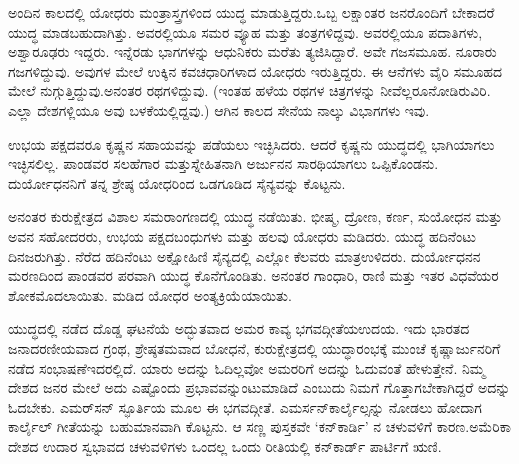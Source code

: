 \vskip 0.1cm

ಅಂದಿನ ಕಾಲದಲ್ಲಿ ಯೋಧರು ಮಂತ್ರಾಸ್ತ್ರಗಳಿಂದ ಯುದ್ಧ ಮಾಡುತ್ತಿದ್ದರು.\break ಒಬ್ಬ ಲಕ್ಷಾಂತರ ಜನರೊಂದಿಗೆ ಬೇಕಾದರೆ ಯುದ್ಧ ಮಾಡಬಹುದಾಗಿತ್ತು. ಅವರಲ್ಲಿಯೂ ಸಮರ ವ್ಯೂಹ ಮತ್ತು ತಂತ್ರಗಳಿದ್ದವು. ಅವರಲ್ಲಿಯೂ ಪದಾತಿಗಳು, ಅಶ್ವಾರೂಢರು ಇದ್ದರು. ಇನ್ನೆರಡು ಭಾಗಗಳನ್ನು ಆಧುನಿಕರು ಮರೆತು ತ್ಯಜಿಸಿದ್ದಾರೆ. ಅವೇ ಗಜ\break ಸಮೂಹ. ನೂರಾರು ಗಜಗಳಿದ್ದುವು. ಅವುಗಳ ಮೇಲೆ ಉಕ್ಕಿನ ಕವಚಧಾರಿಗಳಾದ ಯೋಧರು ಇರುತ್ತಿದ್ದರು. ಈ ಆನೆಗಳು ವೈರಿ ಸಮೂಹದ ಮೇಲೆ ನುಗ್ಗುತ್ತಿದ್ದುವು.\break ಅನಂತರ ರಥಗಳಿದ್ದುವು. (ಇಂತಹ ಹಳೆಯ ರಥಗಳ ಚಿತ್ರಗಳನ್ನು ನೀವೆಲ್ಲರೂ\break ನೋಡಿರುವಿರಿ. ಎಲ್ಲಾ ದೇಶಗಳ್ಲಿಯೂ ಅವು ಬಳಕೆಯಲ್ಲಿದ್ದವು.) ಆಗಿನ ಕಾಲದ ಸೇನೆಯ ನಾಲ್ಕು ವಿಭಾಗಗಳು ಇವು.

\vskip 0.1cm

ಉಭಯ ಪಕ್ಷದವರೂ ಕೃಷ್ಣನ ಸಹಾಯವನ್ನು ಪಡೆಯಲು ಇಚ್ಛಿಸಿದರು. ಆದರೆ ಕೃಷ್ಣನು ಯುದ್ಧದಲ್ಲಿ ಭಾಗಿಯಾಗಲು ಇಚ್ಛಿಸಲಿಲ್ಲ. ಪಾಂಡವರ ಸಲಹೆಗಾರ ಮತ್ತು\break ಸ್ನೇಹಿತನಾಗಿ ಅರ್ಜುನನ ಸಾರಥಿಯಾಗಲು ಒಪ್ಪಿಕೊಂಡನು. ದುರ್ಯೋಧನನಿಗೆ ತನ್ನ ಶ್ರೇಷ್ಠ ಯೋಧರಿಂದ ಒಡಗೂಡಿದ ಸೈನ್ಯವನ್ನು ಕೊಟ್ಟನು.

\vskip 0.1cm

ಅನಂತರ ಕುರುಕ್ಷೇತ್ರದ ವಿಶಾಲ ಸಮರಾಂಗಣದಲ್ಲಿ ಯುದ್ಧ ನಡೆಯಿತು. ಭೀಷ್ಮ, ದ್ರೋಣ, ಕರ್ಣ, ಸುಯೋಧನ ಮತ್ತು ಅವನ ಸಹೋದರರು, ಉಭಯ ಪಕ್ಷದ\break ಬಂಧುಗಳು ಮತ್ತು ಹಲವು ಯೋಧರು ಮಡಿದರು. ಯುದ್ಧ ಹದಿನೆಂಟು ದಿನ\break ಜರುಗಿತ್ತು. ನೆರೆದ ಹದಿನೆಂಟು ಅಕ್ಷೋಹಿಣಿ ಸೈನ್ಯದಲ್ಲಿ ಎಲ್ಲೋ ಕೆಲವರು ಮಾತ್ರ\break ಉಳಿದರು. ದುರ್ಯೋಧನನ ಮರಣದಿಂದ ಪಾಂಡವರ ಪರವಾಗಿ ಯುದ್ಧ ಕೊನೆಗೊಂಡಿತು. ಅನಂತರ ಗಾಂಧಾರಿ, ರಾಣಿ ಮತ್ತು ಇತರ ವಿಧವೆಯರ ಶೋಕ\break ಮೊದಲಾಯಿತು. ಮಡಿದ ಯೋಧರ ಅಂತ್ಯಕ್ರಿಯೆಯಾಯಿತು.

\vskip 0.1cm

ಯುದ್ಧದಲ್ಲಿ ನಡೆದ ದೊಡ್ಡ ಘಟನೆಯೆ ಅದ್ಭುತವಾದ ಅಮರ ಕಾವ್ಯ ಭಗವದ್ಗೀತೆಯ\break ಉದಯ. ಇದು ಭಾರತದ ಜನಾದರಣೀಯವಾದ ಗ್ರಂಥ, ಶ್ರೇಷ್ಠತಮವಾದ ಬೋಧನೆ, ಕುರುಕ್ಷೇತ್ರದಲ್ಲಿ ಯುದ್ಧಾರಂಭಕ್ಕೆ ಮುಂಚೆ ಕೃಷ್ಣಾರ್ಜುನರಿಗೆ ನಡೆದ ಸಂಭಾಷಣೆ\break ಇದರಲ್ಲಿದೆ. ಯಾರು ಅದನ್ನು ಓದಿಲ್ಲವೋ ಅಮರರಿಗೆ ಅದನ್ನು ಓದುವಂತೆ ಹೇಳುತ್ತೇನೆ. ನಿಮ್ಮ ದೇಶದ ಜನರ ಮೇಲೆ ಅದು ಎಷ್ಟೊಂದು ಪ್ರಭಾವವನ್ನುಂಟುಮಾಡಿದೆ ಎಂಬುದು ನಿಮಗೆ ಗೊತ್ತಾಗಬೇಕಾಗಿದ್ದರೆ ಅದನ್ನು ಓದಬೇಕು. ಎಮರ್​ಸನ್​ ಸ್ಫೂರ್ತಿಯ ಮೂಲ ಈ ಭಗವದ್ಗೀತೆ. ಎಮರ್ಸನ್​ ಕಾರ್ಲೈಲ್ಸನ್ನು ನೋಡಲು ಹೋದಾಗ ಕಾರ್ಲೈಲ್​ ಗೀತೆಯನ್ನು ಬಹುಮಾನವಾಗಿ ಕೊಟ್ಟನು. ಆ ಸಣ್ಣ ಪುಸ್ತಕವೇ ‘ಕನ್​ಕಾರ್ಡಿ’ ನ ಚಳುವಳಿಗೆ ಕಾರಣ.\break ಅಮೆರಿಕಾ ದೇಶದ ಉದಾರ ಸ್ವಭಾವದ ಚಳುವಳಿಗಳು ಒಂದಲ್ಲ ಒಂದು ರೀತಿಯಲ್ಲಿ ಕನ್​ಕಾರ್ಡ್​ ಪಾರ್ಟಿಗೆ ಋಣಿ.

\vskip 0.1cm

